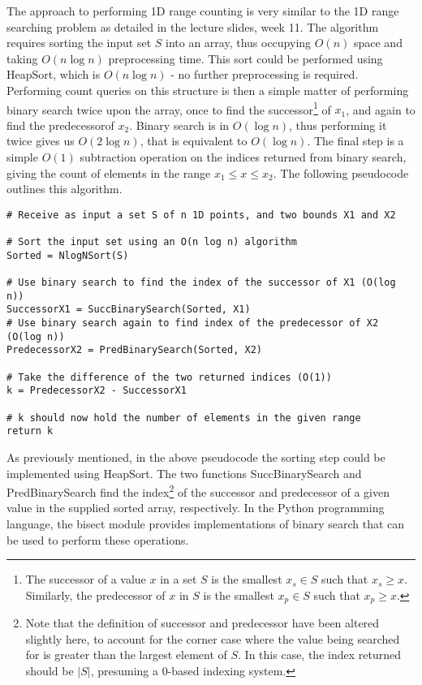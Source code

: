\documentclass[paper=a4, fontsize=12pt]{article}
\begin{document}
The approach to performing 1D range counting is very similar to the 1D range
searching problem as detailed in the lecture slides, week 11. The algorithm
requires sorting the input set \(S\) into an array, thus occupying \(O(n)\)
space and taking \(O(n \log n)\) preprocessing time. This sort could be
performed using HeapSort, which is \(O(n \log n)\) - no further preprocessing
is required. Performing count queries on this structure is then a simple matter
of performing binary search twice upon the array, once to find the
successor\footnote{The successor of a value \(x\) in a set \(S\) is the
 smallest \(x_s \in S\) such that \(x_s \geq x\). Similarly, the predecessor
 of \(x\) in \(S\) is the smallest \(x_p \in S\) such that \(x_p \geq x\).} of
\(x_1\), and again to find the predecessor\footnotemark[\value{footnote}] of
\(x_2\). Binary search is in \(O(\log n)\), thus performing it twice gives us
\(O(2 \log n)\), that is equivalent to \(O(\log n)\). The final step is a
simple \(O(1)\) subtraction operation on the indices returned from binary
search, giving the count of elements in the range \(x_1 \leq x \leq x_2\). The
following pseudocode outlines this algorithm.

\begin{lstlisting}
# Receive as input a set S of n 1D points, and two bounds X1 and X2

# Sort the input set using an O(n log n) algorithm
Sorted = NlogNSort(S)

# Use binary search to find the index of the successor of X1 (O(log n))
SuccessorX1 = SuccBinarySearch(Sorted, X1)
# Use binary search again to find index of the predecessor of X2 (O(log n))
PredecessorX2 = PredBinarySearch(Sorted, X2)

# Take the difference of the two returned indices (O(1))
k = PredecessorX2 - SuccessorX1

# k should now hold the number of elements in the given range
return k
\end{lstlisting}

As previously mentioned, in the above pseudocode the sorting step could be
implemented using HeapSort. The two functions SuccBinarySearch and
PredBinarySearch find the index\footnote{Note that the definition of successor
 and predecessor have been altered slightly here, to account for the corner
 case where the value being searched for is greater than the largest element
 of \(S\). In this case, the index returned should be \(|S|\), presuming a
 0-based indexing system.} of the successor and predecessor of a given value
in the supplied sorted array, respectively. In the Python programming language,
the bisect module provides implementations of binary search that can be used to
perform these operations.
\end{document}
